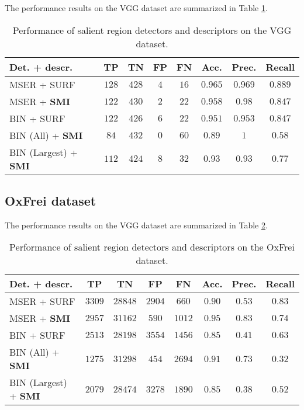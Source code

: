 \documentclass[a4paper,11pt]{article}
\begin{document}
The performance results on the VGG dataset are summarized in Table \ref{tab:vgg}.
\begin{table}[!ht]
\begin{center}
\begin{tabular}{|l||c|c|c|c|c|c|c|}

\hline
Det. + descr. & TP & TN & FP & FN & Acc. &Prec. &Recall\\
\hline
\hline
MSER + SURF & $128$ & $428$ &$4$ & $16$ & $0.965$ & $0.969$ & $0.889$\\
\hline
MSER + \bf{SMI} & $122$ &$430$  &$2$  &$22$  &$0.958$  & $0.98$ & $0.847$\\
\hline
BIN + SURF & $122$ & $426$ & $6$ & $22$ & $0.951$ & $0.953$ &$0.847$\\
\hline
BIN (All) + \bf{SMI} &$84$  &$432$  &$0$  &$60$ &$0.89$  & $1$ &$0.58$ \\
\hline
BIN (Largest) + \bf{SMI} &$112$  &$424$  &$8$  &$32$ &$0.93$  & $0.93$ &$0.77$ \\
\hline
\end{tabular}
\end{center}
\vspace{-20pt}
\caption{Performance of salient region detectors and descriptors on the VGG dataset.} \label{tab:vgg}
  \vspace{-10pt}
\end{table}

\subsection{OxFrei dataset}

The performance results on the VGG dataset are summarized in Table \ref{tab:oxfrei}.
\begin{table}[!ht]
\begin{center}
\begin{tabular}{|l||c|c|c|c|c|c|c|}

\hline
Det. + descr. & TP & TN & FP & FN & Acc. &Prec. &Recall\\
\hline
\hline
MSER + SURF & $3309$ & $28848$ & $2904$ & $660$ & $0.90$ & $0.53$ & $0.83$\\
\hline
MSER + \bf{SMI} & $2957$ & $31162$ & $590$ & $1012$ & $0.95$ &$0.83$ & $0.74$\\
\hline
BIN + SURF & $2513$ & $28198$ & $3554$ & $1456$ & $0.85$ &$0.41$ & $0.63$\\
\hline
BIN (All) + \bf{SMI}  & $1275$ & $31298$ & $454$ & $2694$ & $0.91$ &$0.73$ & $0.32$\\
\hline
BIN (Largest) + \bf{SMI}  & $2079$& $28474$ & $3278$ & $1890$ & $0.85$ & $0.38$ & $0.52$\\
\hline
\end{tabular}
\end{center}
\vspace{-20pt}
\caption{Performance of salient region detectors and descriptors on the OxFrei dataset.} \label{tab:oxfrei}
  \vspace{-10pt}
\end{table}
\end{document}
